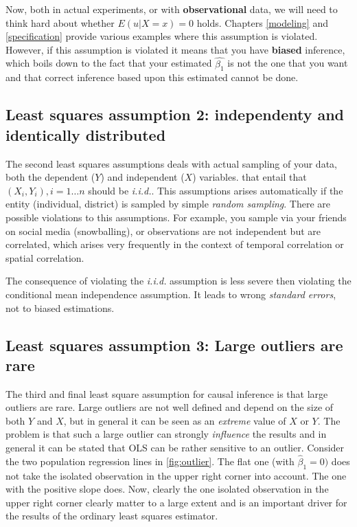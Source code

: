 \documentclass[
]{book}
\begin{document}
Now, both in actual experiments, or with \textbf{observational} data, we will need to think hard about whether \(E(u|X = x) = 0\) holds. Chapters \ref{modeling} and \ref{specification} provide various examples where this assumption is violated. However, if this assumption is violated it means that you have \textbf{biased} inference, which boils down to the fact that your estimated \(\hat{\beta_1}\) is not the one that you want and that correct inference based upon this estimated cannot be done.

\hypertarget{least-squares-assumption-2-independenty-and-identically-distributed}{%
\subsection{Least squares assumption 2: independenty and identically distributed}\label{least-squares-assumption-2-independenty-and-identically-distributed}}

The second least squares assumptions deals with actual sampling of your data, both the dependent (\(Y\)) and independent (\(X\)) variables. that entail that \((X_i,Y_i), i = 1 \dots n\) should be \emph{i.i.d.}. This assumptions arises automatically if the entity (individual, district) is sampled by simple \emph{random sampling}. There are possible violations to this assumptions. For example, you sample via your friends on social media (snowballing), or observations are not independent but are correlated, which arises very frequently in the context of temporal correlation or spatial correlation.

The consequence of violating the \emph{i.i.d.} assumption is less severe then violating the conditional mean independence assumption. It leads to wrong \emph{standard errors}, not to biased estimations.

\hypertarget{least-squares-assumption-3-large-outliers-are-rare}{%
\subsection{Least squares assumption 3: Large outliers are rare}\label{least-squares-assumption-3-large-outliers-are-rare}}

The third and final least square assumption for causal inference is that large outliers are rare. Large outliers are not well defined and depend on the size of both \(Y\) and \(X\), but in general it can be seen as an \emph{extreme} value of \(X\) or \(Y\). The problem is that such a large outlier can strongly \emph{influence} the results and in general it can be stated that OLS can be rather sensitive to an outlier. Consider the two population regression lines in \ref{fig:outlier}. The flat one (with \(\hat{\beta}_1 = 0)\) does not take the isolated observation in the upper right corner into account. The one with the positive slope does. Now, clearly the one isolated observation in the upper right corner clearly matter to a large extent and is an important driver for the results of the ordinary least squares estimator.
\end{document}
